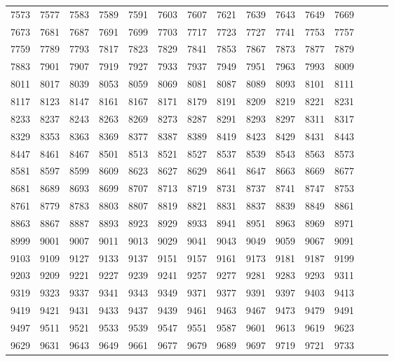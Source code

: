 \documentclass[10pt, a4paper]{article}
\begin{document}
\begin{center}
\begin{longtable}{c c c c c c c c c c c c c c c}
        7573 & 7577 & 7583 & 7589 & 7591 & 7603 & 7607 & 7621 & 7639 & 7643 & 7649 & 7669 \\
        7673 & 7681 & 7687 & 7691 & 7699 & 7703 & 7717 & 7723 & 7727 & 7741 & 7753 & 7757 \\
        7759 & 7789 & 7793 & 7817 & 7823 & 7829 & 7841 & 7853 & 7867 & 7873 & 7877 & 7879 \\
        7883 & 7901 & 7907 & 7919 & 7927 & 7933 & 7937 & 7949 & 7951 & 7963 & 7993 & 8009 \\
        8011 & 8017 & 8039 & 8053 & 8059 & 8069 & 8081 & 8087 & 8089 & 8093 & 8101 & 8111 \\
        8117 & 8123 & 8147 & 8161 & 8167 & 8171 & 8179 & 8191 & 8209 & 8219 & 8221 & 8231 \\
        8233 & 8237 & 8243 & 8263 & 8269 & 8273 & 8287 & 8291 & 8293 & 8297 & 8311 & 8317 \\
        8329 & 8353 & 8363 & 8369 & 8377 & 8387 & 8389 & 8419 & 8423 & 8429 & 8431 & 8443 \\
        8447 & 8461 & 8467 & 8501 & 8513 & 8521 & 8527 & 8537 & 8539 & 8543 & 8563 & 8573 \\
        8581 & 8597 & 8599 & 8609 & 8623 & 8627 & 8629 & 8641 & 8647 & 8663 & 8669 & 8677 \\
        8681 & 8689 & 8693 & 8699 & 8707 & 8713 & 8719 & 8731 & 8737 & 8741 & 8747 & 8753 \\
        8761 & 8779 & 8783 & 8803 & 8807 & 8819 & 8821 & 8831 & 8837 & 8839 & 8849 & 8861 \\
        8863 & 8867 & 8887 & 8893 & 8923 & 8929 & 8933 & 8941 & 8951 & 8963 & 8969 & 8971 \\
        8999 & 9001 & 9007 & 9011 & 9013 & 9029 & 9041 & 9043 & 9049 & 9059 & 9067 & 9091 \\
        9103 & 9109 & 9127 & 9133 & 9137 & 9151 & 9157 & 9161 & 9173 & 9181 & 9187 & 9199 \\
        9203 & 9209 & 9221 & 9227 & 9239 & 9241 & 9257 & 9277 & 9281 & 9283 & 9293 & 9311 \\
        9319 & 9323 & 9337 & 9341 & 9343 & 9349 & 9371 & 9377 & 9391 & 9397 & 9403 & 9413 \\
        9419 & 9421 & 9431 & 9433 & 9437 & 9439 & 9461 & 9463 & 9467 & 9473 & 9479 & 9491 \\
        9497 & 9511 & 9521 & 9533 & 9539 & 9547 & 9551 & 9587 & 9601 & 9613 & 9619 & 9623 \\
        9629 & 9631 & 9643 & 9649 & 9661 & 9677 & 9679 & 9689 & 9697 & 9719 & 9721 & 9733 \\

\end{longtable}
\end{center}
\end{document}
